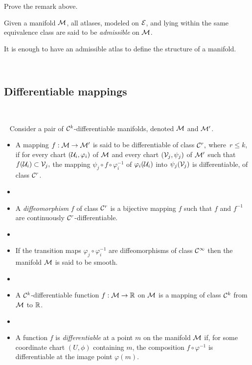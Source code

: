 \begin{ex}
Prove the remark above.
\end{ex}

\begin{definition}
Given a manifold $\mathcal{M}$,
all atlases, modeled on $\mathcal{E}$, and lying within the same equivalence class are said  to be \emph{admissible} on $\mathcal{M}$.
\end{definition} 

It is enough to have an admissible atlas to define the structure of a manifold.

\,
\subsection{Differentiable mappings}
\, 

\begin{definition}~\label{DiffMap}
Consider a pair of $\mathcal{C}^k$-differentiable manifolds, denoted  $\mathcal{M}$ and $\mathcal{M}'$.
\begin{itemize}
\item A mapping $f: \mathcal{M} \to
\mathcal{M}'$ is said to be differentiable of class $\mathcal{C}^r,$ where $\, r\leq k$, if for every chart $(\mathcal{U}_i,\varphi_i)$ of $\mathcal{M}$ and every chart $(\mathcal{V}_j,\psi_j)$ of  $\mathcal{M}'$ such that $f(\mathcal{U}_i) \subset \mathcal{V}_j,$ the mapping $\psi_j
\circ f \circ \varphi_i^{-1}$ 
 of $\varphi_i(\mathcal{U}_i)$ into $\psi_j(\mathcal{V}_j)$ is
differentiable, of class $\mathcal{C}^r$.

\item[ ]
\item A \emph{diffeomorphism}  $f$ of class $\mathcal{C}^r$ is a bijective mapping $f$ such that $f$ and $f^{-1}$ are continuously $\mathcal{C}^r$-differentiable.
\item[ ]

\item If the transition maps $\varphi_j\circ\varphi_i^{-1}$ are diffeomorphisms of class $\mathcal{C}^\infty$ then the manifold $\mathcal{M}$ is said to be smooth.


\item[ ]
\item A $\mathcal{C}^k$-differentiable function $f:\mathcal{M} \to \mathbb{R}$ on $\mathcal{M}$ is a mapping of class $\mathcal{C}^k$ from 
$\mathcal{M}$ to $\mathbb{R}$. 
\item[ ]
\item A function $f$ is \emph{differentiable} at a point $ m$ on the manifold $\mathcal{M}$ if, for some coordinate chart $(U,\phi)$ containing $ m$, the composition $f\circ \varphi^{-1}$ is differentiable at the image point $\varphi(m)$. %
\end{itemize}
\end{definition}

